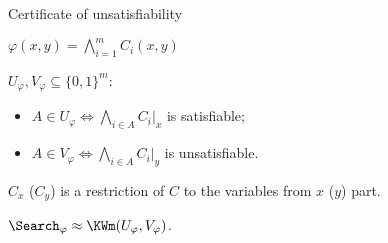\begin{frame}{Certificate of unsatisfiability}

    $\varphi(x, y) = \bigwedge\limits_{i = 1}^{m} C_i(x, y)$

    \vspace{0.5cm}

    $U_{\varphi}, V_{\varphi} \subseteq \{0, 1\}^m$:
    \begin{itemize}
        \item $A \in U_{\varphi} \Leftrightarrow \bigwedge\limits_{i \in A} C_i|_{x}$ is satisfiable;
        \item $A \in V_{\varphi} \Leftrightarrow \bigwedge\limits_{i \in A} C_i|_{y}$ is unsatisfiable.
    \end{itemize}

    $C_{x}$ ($C_{y}$) is a restriction of $C$ to the variables from $x$ ($y$) part.

    \begin{lemma}
        $\Search_{\varphi} \approx \KWm(U_{\varphi}, V_{\varphi})$.
    \end{lemma}
\end{frame}


